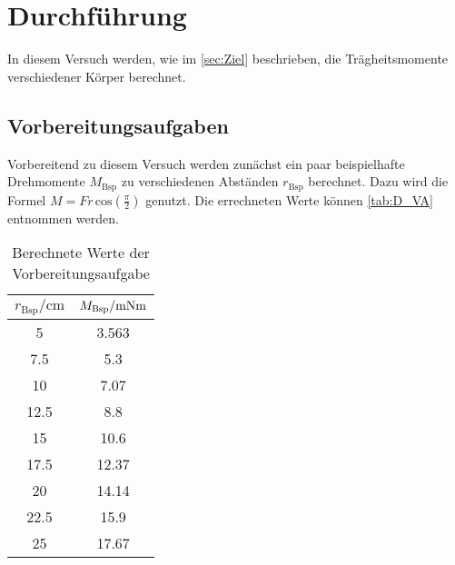 \section{Durchführung}
\label{sec:Durchführung}
In diesem Versuch werden, wie im \autoref{sec:Ziel} beschrieben, die Trägheitsmomente verschiedener Körper berechnet. 

\subsection{Vorbereitungsaufgaben}
\label{subsec:D_Va}
Vorbereitend zu diesem Versuch werden zunächst ein paar beispielhafte Drehmomente $M_{\text{Bsp}}$
zu verschiedenen Abständen $r_{\text{Bsp}}$ berechnet. Dazu wird die Formel $M = Fr\, \text{cos}(\frac{\pi}{2})$ genutzt. Die errechneten Werte können \autoref{tab:D_VA} entnommen werden.
\begin{table}
    \centering
    \caption{Berechnete Werte der Vorbereitungsaufgabe} 
    \label{tab:D_VA}
    \begin{tabular}{c c}
        \toprule
        $r_{\text{Bsp}}\mathrm{/} \unit{\centi\metre}$ & $M_{\text{Bsp}}\mathrm{/}\unit{{\milli\newton\metre}}$\\
        \midrule
        5 & 3.563 \\
        7.5 & 5.3 \\
        10 & 7.07 \\
        12.5 & 8.8 \\
        15 & 10.6 \\
        17.5 & 12.37 \\
        20 & 14.14 \\
        22.5 & 15.9 \\
        25 & 17.67 \\
        \bottomrule 
    \end{tabular}
\end{table}